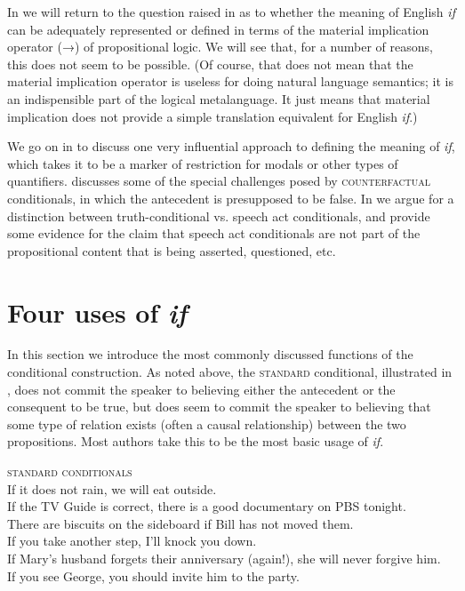 In  we will return to the question raised in  as to whether the meaning of English \textit{if} can be adequately represented or defined in terms of the material implication operator (→) of propositional logic. We will see that, for a number of reasons, this does not seem to be possible. (Of course, that does not mean that the material implication operator is useless for doing natural language semantics; it is an indispensible part of the logical metalanguage. It just means that material implication does not provide a simple translation equivalent for English \textit{if}.)



We go on in  to discuss one very influential approach to defining the meaning of \textit{if}, which takes it to be a marker of restriction for modals or other types of quantifiers.  discusses some of the special challenges posed by \textsc{counterfactual} conditionals, in which the antecedent is presupposed to be false. In  we argue for a distinction between truth-conditional vs. speech act conditionals, and provide some evidence for the claim that speech act conditionals are not part of the propositional content that is being asserted, questioned, etc.


\section{Four uses of \textit{if}}\label{sec:19.2}

In this section we introduce the most commonly discussed functions of the conditional construction. As noted above, the \textsc{standard} conditional, illustrated in , does not commit the speaker to believing either the antecedent or the consequent to be true, but does seem to commit the speaker to believing that some type of relation exists (often a causal relationship) between the two propositions. Most authors take this to be the most basic usage of \textit{if}.


\ea
\textsc{standard conditionals}\\
\ea If it does not rain, we will eat outside.\\
\ex If the TV Guide is correct, there is a good documentary on PBS tonight.\\
\ex There are biscuits on the sideboard if Bill has not moved them.\\
\ex If you take another step, I’ll knock you down.\\
\ex If Mary’s husband forgets their anniversary (again!), she will never forgive him.\\
\ex If you see George, you should invite him to the party.
                       \z
\z


